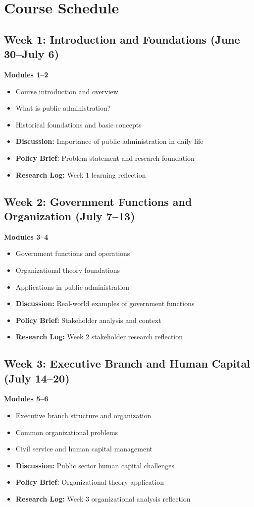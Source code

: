 \documentclass[11pt]{scrartcl} %
\begin{document}
\section{Course Schedule}

\subsection{Week 1: Introduction and Foundations (June 30--July 6)}
\textbf{Modules 1--2}
\begin{itemize}
\item Course introduction and overview
\item What is public administration?
\item Historical foundations and basic concepts
\item \textbf{Discussion:} Importance of public administration in daily life
\item \textbf{Policy Brief:} Problem statement and research foundation
\item \textbf{Research Log:} Week 1 learning reflection
\end{itemize}

\subsection{Week 2: Government Functions and Organization (July 7--13)}
\textbf{Modules 3--4}
\begin{itemize}
\item Government functions and operations
\item Organizational theory foundations
\item Applications in public administration
\item \textbf{Discussion:} Real-world examples of government functions
\item \textbf{Policy Brief:} Stakeholder analysis and context
\item \textbf{Research Log:} Week 2 stakeholder research reflection
\end{itemize}

\subsection{Week 3: Executive Branch and Human Capital (July 14--20)}
\textbf{Modules 5--6}
\begin{itemize}
\item Executive branch structure and organization
\item Common organizational problems
\item Civil service and human capital management
\item \textbf{Discussion:} Public sector human capital challenges
\item \textbf{Policy Brief:} Organizational theory application
\item \textbf{Research Log:} Week 3 organizational analysis reflection
\end{itemize}
\end{document}
